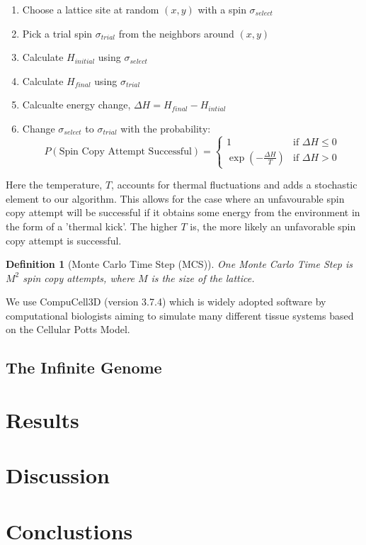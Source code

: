 \documentclass[12pt]{article}
\newtheorem{definition}{Definition}
\begin{document}
\begin{enumerate}
  \item Choose a lattice site at random $(x,y)$ with a spin $\sigma_{select}$
  \item Pick a trial spin $\sigma_{trial}$ from the neighbors around $(x,y)$
  \item Calculate $H_{initial}$ using $\sigma_{select}$
  \item Calculate $H_{final}$ using $\sigma_{trial}$
  \item Calcualte energy change, $\Delta H = H_{final} - H_{intial}$
  \item{ Change $\sigma_{select}$ to $\sigma_{trial}$ with the probability:
  \begin{equation}
 		P(\text{Spin Copy Attempt Successful}) =
  	\begin{cases}
   		1 & \text{if } \Delta H \leq 0 \\
   		\exp{(-\frac{\Delta H}{T})}       & \text{if } \Delta H > 0
  	\end{cases}
  	\label{p_attempt_success}
	\end{equation}
}
\end{enumerate}

Here the temperature, $T$, accounts for thermal fluctuations and adds a stochastic element to our algorithm. This allows for the case where an unfavourable spin copy attempt will be successful if it obtains some energy from the environment in the form of a 'thermal kick'. The higher $T$ is, the more likely an unfavorable spin copy attempt is successful.

\begin{definition}[Monte Carlo Time Step (MCS)] One Monte Carlo Time Step is $M^2$ spin copy attempts, where $M$ is the size of the lattice.
\end{definition}

We use CompuCell3D \cite{Swat2012} (version 3.7.4) which is widely adopted software by computational biologists aiming to simulate many different tissue systems based on the Cellular Potts Model.

\subsection{The Infinite Genome}


\subsection{}


% 
% 
\section{Results}




% 
% 
\section{Discussion}




% 
% 
\section{Conclustions}


\newpage


\end{document}
